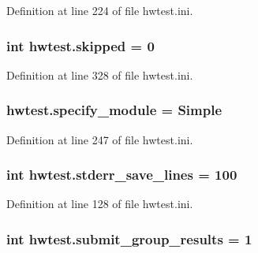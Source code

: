 Definition at line 224 of file hwtest.\-ini.

\hypertarget{namespacehwtest_a52e9a2d299cf53080aa90654ddcaf209}{
\subsubsection[{skipped}]{\setlength{\rightskip}{0pt plus 5cm}int hwtest.\-skipped = 0}}\label{namespacehwtest_a52e9a2d299cf53080aa90654ddcaf209}


Definition at line 328 of file hwtest.\-ini.

\hypertarget{namespacehwtest_a776d2af9b2bb100b49d3709b6e256797}{
\subsubsection[{specify\-\_\-module}]{\setlength{\rightskip}{0pt plus 5cm}hwtest.\-specify\-\_\-module = Simple}}\label{namespacehwtest_a776d2af9b2bb100b49d3709b6e256797}


Definition at line 247 of file hwtest.\-ini.

\hypertarget{namespacehwtest_aa6450e0e7dfc9a867ed2a7a81477aba2}{
\subsubsection[{stderr\-\_\-save\-\_\-lines}]{\setlength{\rightskip}{0pt plus 5cm}int hwtest.\-stderr\-\_\-save\-\_\-lines = 100}}\label{namespacehwtest_aa6450e0e7dfc9a867ed2a7a81477aba2}


Definition at line 128 of file hwtest.\-ini.

\hypertarget{namespacehwtest_ae28e9902dd28944ecda9bacac16b28b5}{
\subsubsection[{submit\-\_\-group\-\_\-results}]{\setlength{\rightskip}{0pt plus 5cm}int hwtest.\-submit\-\_\-group\-\_\-results = 1}}\label{namespacehwtest_ae28e9902dd28944ecda9bacac16b28b5}



